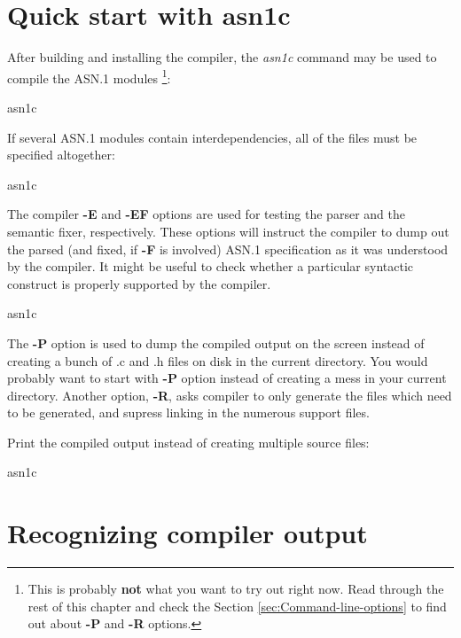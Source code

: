 \documentclass[english,oneside,12pt]{book}
\begin{document}
\section{Quick start with asn1c}

After building and installing the compiler, the \emph{asn1c}
command may be used to compile the ASN.1 modules%
\footnote{This is probably \textbf{not} what you want to try out right now. Read through the rest of this chapter and check the Section \vref{sec:Command-line-options}
to find out about \textbf{-P} and \textbf{-R} options.%
}:
\begin{bash}
asn1c %
\end{bash}
If several ASN.1 modules contain interdependencies, all of the files
must be specified altogether:
\begin{bash}
asn1c %
\end{bash}
The compiler \textbf{-E} and \textbf{-EF} options are used for testing
the parser and the semantic fixer, respectively. These options will
instruct the compiler to dump out the parsed (and fixed, if \textbf{-F}
is involved) ASN.1 specification as it was understood
by the compiler. It might be useful to check whether a particular
syntactic construct is properly supported by the compiler.
\begin{bash}
asn1c %
\end{bash}
The \textbf{-P} option is used to dump the compiled output on the
screen instead of creating a bunch of .c and .h files on disk in the
current directory. You would probably want to start with \textbf{-P}
option instead of creating a mess in your current directory. Another
option, \textbf{-R}, asks compiler to only generate the files which
need to be generated, and supress linking in the numerous support
files.

Print the compiled output instead of creating multiple source files:
\begin{bash}
asn1c %
\end{bash}

\clearpage{}
\section{Recognizing compiler output}
\end{document}

